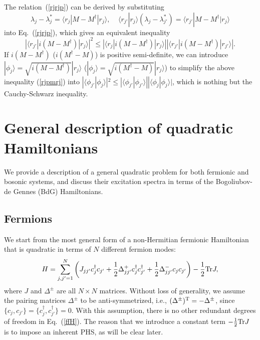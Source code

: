 \documentclass{tADP2e}
\theoremstyle{plain}
\theoremstyle{plain}
\theoremstyle{definition}
\begin{document}
\begin{appendices}
\vspace{3pt}
\noindent
The relation~(\ref{rjrjp}) can be derived by substituting 
\begin{equation}
\lambda_j-\lambda_j^*=\langle r_j|M-M^\dag|r_j\rangle,\;\;\;\;%
\langle r_{j'}| r_j\rangle(\lambda_j-\lambda_{j'}^*)=\langle r_{j'}|M-M^\dag|r_j\rangle
\end{equation}
into Eq.~(\ref{rjrjp}), which gives an equivalent inequality
\begin{equation}
|\langle r_{j'}|i(M-M^\dag)|r_j\rangle|^2\le|\langle r_j|i(M-M^\dag)|r_j\rangle||\langle r_{j'}|i(M-M^\dag)|r_{j'}\rangle|.
\label{rjpmrj}
\end{equation}
If $i(M-M^\dag)$ ($i(M^\dag -M)$) is positive semi-definite, we can introduce $|\phi_j\rangle=\sqrt{i(M-M^\dag)}|r_j\rangle$ ($|\phi_j\rangle=\sqrt{i(M^\dag-M)}|r_j\rangle$) to simplify the above inequality (\ref{rjpmrj}) into $|\langle\phi_{j'}|\phi_j\rangle|^2\le|\langle\phi_{j'}|\phi_{j'}\rangle||\langle\phi_j|\phi_j\rangle|$, which is nothing but the Cauchy-Schwarz inequality. 



\section{General description of quadratic Hamiltonians}\label{app2}
We provide a description of a general quadratic problem for both fermionic and bosonic systems, and discuss their excitation spectra in terms of the Bogoliubov-de Gennes (BdG) Hamiltonians. 
\subsection*{Fermions}
We start from the most general form of a non-Hermitian fermionic Hamiltonian that is quadratic in terms of $N$ different fermion modes: %
\begin{equation}
H=\sum^N_{j,j'=1}\left(J_{jj'}c_j^\dag c_{j'}+\frac{1}{2}\Delta^+_{jj'}c_j^\dag c_{j'}^\dag+\frac{1}{2}\Delta^-_{jj'}c_jc_{j'}\right)-\frac{1}{2}{\rm Tr} J,
\label{ffH}
\end{equation}
where $J$ and $\Delta^\pm$ are all $N\times N$ matrices. Without loss of generality, we assume the pairing matrices $\Delta^\pm$ to be anti-symmetrized, i.e., $(\Delta^\pm)^{\rm T}=-\Delta^\pm$, since $\{c_j,c_{j'}\}=\{c_j^\dag,c_{j'}^\dag\}=0$. With this assumption, there is no other redundant degrees of freedom in Eq.~(\ref{ffH}). The reason that we introduce a constant term $-\frac{1}{2}{\rm Tr}J$ is to impose an inherent PHS, %
as will be clear later.


\end{appendices}
\end{document}
